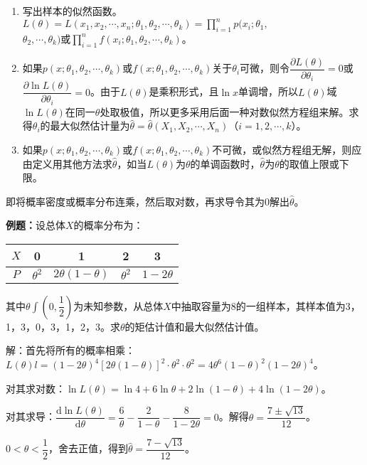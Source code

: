 \documentclass[UTF8, 12pt]{ctexart}
\begin{document}
\begin{enumerate}
    \item 写出样本的似然函数。$L(\theta)=L(x_1,x_2,\cdots,x_n;\theta_1,\theta_2,\cdots,\theta_k)=\prod\limits_{i=1}^np(x_i;\theta_1,$\\$\theta_2,\cdots,\theta_k)$或$\prod\limits_{i=1}^nf(x_i;\theta_1,\theta_2,\cdots,\theta_k)$。
    \item 如果$p(x;\theta_1,\theta_2,\cdots,\theta_k)$或$f(x;\theta_1,\theta_2,\cdots,\theta_k)$关于$\theta_i$可微，则令$\dfrac{\partial L(\theta)}{\partial\theta_i}=0$或$\dfrac{\partial\ln L(\theta)}{\partial\theta_i}=0$。由于$L(\theta)$是乘积形式，且$\ln x$单调增，所以$L(\theta)$域$\ln L(\theta)$在同一$\theta$处取极值，所以更多采用后面一种对数似然方程组来解。求得$\theta_i$的最大似然估计量为$\hat{\theta}=\hat{\theta}(X_1,X_2,\cdots,X_n)$（$i=1,2,\cdots,k$）。
    \item 如果$p(x;\theta_1,\theta_2,\cdots,\theta_k)$或$f(x;\theta_1,\theta_2,\cdots,\theta_k)$不可微，或似然方程组无解，则应由定义用其他方法求$\hat{\theta}$，如当$L(\theta)$为$\theta$的单调函数时，$\hat{\theta}$为$\theta$的取值上限或下限。
\end{enumerate}

即将概率密度或概率分布连乘，然后取对数，再求导令其为0解出$\hat{\theta}$。

\textbf{例题：}设总体$X$的概率分布为：\medskip

\begin{tabular}{c|cccc}
    \hline
    $X$ & 0 & 1 & 2 & 3 \\ \hline
    $P$ & $\theta^2$ & $2\theta(1-\theta)$ & $\theta^2$ & $1-2\theta$ \\ \hline
\end{tabular} \medskip

其中$\theta\int\left(0,\dfrac{1}{2}\right)$为未知参数，从总体$X$中抽取容量为8的一组样本，其样本值为3，1，3，0，3，1，2，3。求$\theta$的矩估计值和最大似然估计值。

解：首先将所有的概率相乘：$L(\theta)l=(1-2\theta)^4[2\theta(1-\theta)]^2\cdot\theta^2\cdot\theta^2=4\theta^6(1-\theta)^2(1-2\theta)^4$。

对其求对数：$\ln L(\theta)=\ln4+6\ln\theta+2\ln(1-\theta)+4\ln(1-2\theta)$。

对其求导：$\dfrac{\textrm{d}\ln L(\theta)}{\textrm{d}\theta}=\dfrac{6}{\theta}-\dfrac{2}{1-\theta}-\dfrac{8}{1-2\theta}=0$。解得$\theta=\dfrac{7\pm\sqrt{13}}{12}$。

$0<\theta<\dfrac{1}{2}$，舍去正值，得到$\hat{\theta}=\dfrac{7-\sqrt{13}}{12}$。
\end{document}
